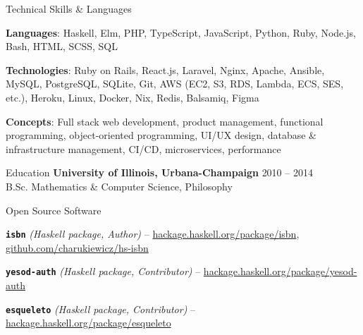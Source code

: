 \documentclass{resume} %
\begin{document}
\begin{rSection}{Technical Skills \& Languages}

\begin{rListSection}
\item \textbf{Languages}: Haskell, Elm, PHP, TypeScript, JavaScript, Python, Ruby, Node.js, Bash, HTML, SCSS, SQL
\item \textbf{Technologies}:  Ruby on Rails, React.js, Laravel, Nginx, Apache, Ansible, MySQL, PostgreSQL, SQLite, Git, AWS (EC2, S3, RDS, Lambda, ECS, SES, etc.), Heroku, Linux, Docker, Nix, Redis, Balsamiq, Figma
\item \textbf{Concepts}: Full stack web development, product management, functional programming, object-oriented programming, UI/UX design, database \& infrastructure management, CI/CD, microservices, performance
\end{rListSection}

\end{rSection}


\begin{rSection}{Education}
{\bf University of Illinois, Urbana-Champaign} \hfill {\textsc{2010 -- 2014}} \\
B.Sc. Mathematics \& Computer Science, Philosophy
\end{rSection}


\begin{rSection}{Open Source Software}

\begin{rListSection}
\item \textbf{\texttt{isbn}} {\em (Haskell package, Author)} -- \href{https://hackage.haskell.org/package/isbn}{hackage.haskell.org/package/isbn}, \href{https://github.com/charukiewicz/hs-isbn}{github.com/charukiewicz/hs-isbn}
\item \textbf{\texttt{yesod-auth}} {\em (Haskell package, Contributor)} -- \href{https://hackage.haskell.org/package/yesod-auth}{hackage.haskell.org/package/yesod-auth}
\item \textbf{\texttt{esqueleto}} {\em (Haskell package, Contributor)} -- \href{https://hackage.haskell.org/package/esqueleto}{hackage.haskell.org/package/esqueleto}
\end{rListSection}

\end{rSection}
\end{document}
